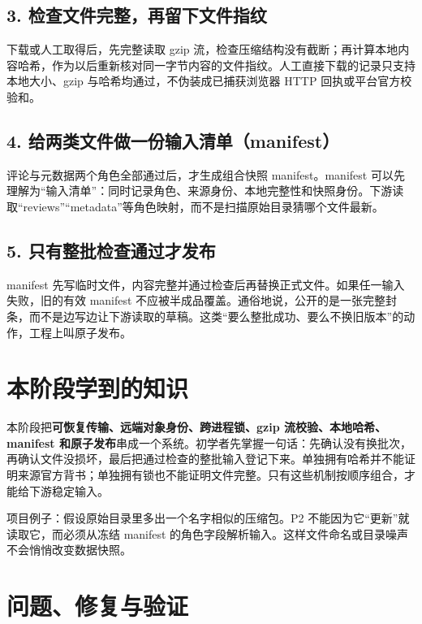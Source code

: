 \subsection{3. 检查文件完整，再留下文件指纹}

下载或人工取得后，先完整读取 gzip 流，检查压缩结构没有截断；再计算本地内容哈希，作为以后重新核对同一字节内容的文件指纹。人工直接下载的记录只支持本地大小、gzip 与哈希均通过，不伪装成已捕获浏览器 HTTP 回执或平台官方校验和。

\subsection{4. 给两类文件做一份输入清单（manifest）}

评论与元数据两个角色全部通过后，才生成组合快照 manifest。manifest 可以先理解为“输入清单”：同时记录角色、来源身份、本地完整性和快照身份。下游读取“reviews”“metadata”等角色映射，而不是扫描原始目录猜哪个文件最新。

\subsection{5. 只有整批检查通过才发布}

manifest 先写临时文件，内容完整并通过检查后再替换正式文件。如果任一输入失败，旧的有效 manifest 不应被半成品覆盖。通俗地说，公开的是一张完整封条，而不是边写边让下游读取的草稿。这类“要么整批成功、要么不换旧版本”的动作，工程上叫原子发布。

\section{本阶段学到的知识}

本阶段把\textbf{可恢复传输、远端对象身份、跨进程锁、gzip 流校验、本地哈希、manifest 和原子发布}串成一个系统。初学者先掌握一句话：先确认没有换批次，再确认文件没损坏，最后把通过检查的整批输入登记下来。单独拥有哈希并不能证明来源官方背书；单独拥有锁也不能证明文件完整。只有这些机制按顺序组合，才能给下游稳定输入。

\begin{beginnerbox}
项目例子：假设原始目录里多出一个名字相似的压缩包。P2 不能因为它“更新”就读取它，而必须从冻结 manifest 的角色字段解析输入。这样文件命名或目录噪声不会悄悄改变数据快照。
\end{beginnerbox}

\section{问题、修复与验证}

